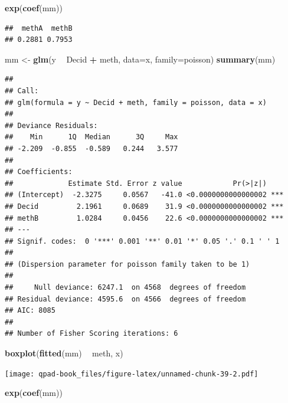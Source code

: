 \documentclass[12pt,]{book}
\newenvironment{Shaded}{\begin{snugshade}}{\end{snugshade}}
\newcommand{\DataTypeTok}[1]{\textcolor[rgb]{0.13,0.29,0.53}{#1}}
\newcommand{\KeywordTok}[1]{\textcolor[rgb]{0.13,0.29,0.53}{\textbf{#1}}}
\newcommand{\NormalTok}[1]{#1}
\newcommand{\OperatorTok}[1]{\textcolor[rgb]{0.81,0.36,0.00}{\textbf{#1}}}
\newcommand{\StringTok}[1]{\textcolor[rgb]{0.31,0.60,0.02}{#1}}
\begin{document}
\begin{Shaded}
\begin{Highlighting}[]
\KeywordTok{exp}\NormalTok{(}\KeywordTok{coef}\NormalTok{(mm))}
\end{Highlighting}
\end{Shaded}

\begin{verbatim}
##  methA  methB 
## 0.2881 0.7953
\end{verbatim}

\begin{Shaded}
\begin{Highlighting}[]
\NormalTok{mm <-}\StringTok{ }\KeywordTok{glm}\NormalTok{(y }\OperatorTok{~}\StringTok{ }\NormalTok{Decid }\OperatorTok{+}\StringTok{ }\NormalTok{meth, }\DataTypeTok{data=}\NormalTok{x, }\DataTypeTok{family=}\NormalTok{poisson)}
\KeywordTok{summary}\NormalTok{(mm)}
\end{Highlighting}
\end{Shaded}

\begin{verbatim}
## 
## Call:
## glm(formula = y ~ Decid + meth, family = poisson, data = x)
## 
## Deviance Residuals: 
##    Min      1Q  Median      3Q     Max  
## -2.209  -0.855  -0.589   0.244   3.577  
## 
## Coefficients:
##             Estimate Std. Error z value            Pr(>|z|)    
## (Intercept)  -2.3275     0.0567   -41.0 <0.0000000000000002 ***
## Decid         2.1961     0.0689    31.9 <0.0000000000000002 ***
## methB         1.0284     0.0456    22.6 <0.0000000000000002 ***
## ---
## Signif. codes:  0 '***' 0.001 '**' 0.01 '*' 0.05 '.' 0.1 ' ' 1
## 
## (Dispersion parameter for poisson family taken to be 1)
## 
##     Null deviance: 6247.1  on 4568  degrees of freedom
## Residual deviance: 4595.6  on 4566  degrees of freedom
## AIC: 8085
## 
## Number of Fisher Scoring iterations: 6
\end{verbatim}

\begin{Shaded}
\begin{Highlighting}[]
\KeywordTok{boxplot}\NormalTok{(}\KeywordTok{fitted}\NormalTok{(mm) }\OperatorTok{~}\StringTok{ }\NormalTok{meth, x)}
\end{Highlighting}
\end{Shaded}

\texttt{[image: qpad-book\_files/figure-latex/unnamed-chunk-39-2.pdf]}

\begin{Shaded}
\begin{Highlighting}[]
\KeywordTok{exp}\NormalTok{(}\KeywordTok{coef}\NormalTok{(mm))}
\end{Highlighting}
\end{Shaded}
\end{document}
